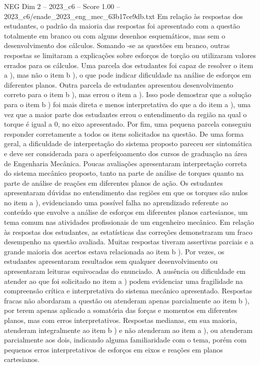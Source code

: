 \begin{textsample}{NEG Dim 2 – 2023\_c6 – Score 1.00 – 2023\_c6/enade\_2023\_eng\_mec\_63b17ce9db.txt}
Em relação às respostas dos estudantes, o padrão da maioria das respostas foi apresentado com a questão totalmente em branco ou com alguns desenhos esquemáticos, mas sem o desenvolvimento dos cálculos.
Somando -se as questões em branco, outras respostas se limitaram a explicações sobre esforços de torção ou utilizaram valores errados para os cálculos.
Uma parcela dos estudantes foi capaz de resolver o item a ), mas não o item b ), o que pode indicar dificuldade na análise de esforços em diferentes planos.
Outra parcela de estudantes apresentou desenvolvimento correto para o item b ), mas errou o item a ).
Isso pode demostrar que a solução para o item b ) foi mais direta e menos interpretativa do que a do item a ), uma vez que a maior parte dos estudantes errou o entendimento da região na qual o torque é igual a 0, no eixo apresentado.
Por fim, uma pequena parcela conseguiu responder corretamente a todos os itens solicitados na questão.
De uma forma geral, a dificuldade de interpretação do sistema proposto pareceu ser sintomática e deve ser considerada para o aperfeiçoamento dos cursos de graduação na área de Engenharia Mecânica.
Poucas avaliações apresentaram interpretação correta do sistema mecânico proposto, tanto na parte de análise de torques quanto na parte de análise de reações em diferentes planos de ação.
Os estudantes apresentaram dúvidas no entendimento das regiões em que os torques são nulos no item a ), evidenciando uma possível falha no aprendizado referente ao conteúdo que envolve a análise de esforços em diferentes planos cartesianos, um tema comum nas atividades profissionais de um engenheiro mecânico.
Em relação às respostas dos estudantes, as estatísticas das correções demonstraram um fraco desempenho na questão avaliada.
Muitas respostas tiveram assertivas parciais e a grande maioria dos acertos estava relacionada ao item b ).
Por vezes, os estudantes apresentaram resultados sem qualquer desenvolvimento ou apresentaram leituras equivocadas do enunciado.
A ausência ou dificuldade em atender ao que foi solicitado no item a ) podem evidenciar uma fragilidade na compreensão crítica e interpretativa do sistema mecânico apresentado.
Respostas fracas não abordaram a questão ou atenderam apenas parcialmente ao item b ), por terem apenas aplicado a somatória das forças e momentos em diferentes planos, mas com erros interpretativos.
Respostas medianas, em sua maioria, atenderam integralmente ao item b ) e não atenderam ao item a ), ou atenderam parcialmente aos dois, indicando alguma familiaridade com o tema, porém com pequenos erros interpretativos de esforços em eixos e reações em planos cartesianos.

\end{textsample}
